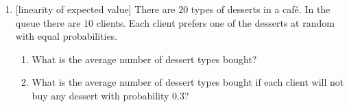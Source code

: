 \documentclass[12pt]{article}
\begin{document}
\begin{enumerate}
    
    \item {[linearity of expected value]} There are $20$ types of desserts in a café. In the queue there are $10$ clients.
Each client prefers one of the desserts at random with equal probabilities.

\begin{enumerate}[label=\alph*)]
  \item What is the average number of dessert types bought?
  \item What is the average number of dessert types bought if each client will not buy any dessert with probability $0.3$?
\end{enumerate}

\end{enumerate}
\end{document}
